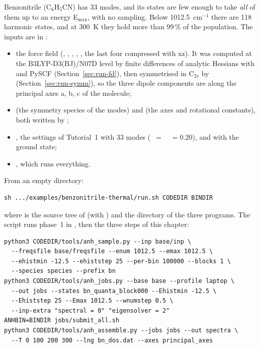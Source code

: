 Benzonitrile (C$_6$H$_5$CN) has 33 modes, and its states are few enough
to take \emph{all} of them up to an energy E$_\mathrm{max}$, with no
sampling. Below 1012.5~cm$^{-1}$ there are 118 harmonic states, and at
300~K they hold more than 99\,\% of the population. The inputs are in
:
\begin{itemize}
\item the force field (, ,
, , , the last four
compressed with xz). It was computed at the B3LYP-D3(BJ)/N07D level by
finite differences of analytic Hessians with  and PySCF
(Section~\ref{sec:run-fd}), then symmetrised in C$_{2v}$ by
(Section~\ref{sec:run-symm}), so the three dipole components are along
the principal axes a, b, c of the molecule;
\item {} (the symmetry species of the modes) and
 (the axes and rotational constants), both written
by ;
\item {}, the settings of Tutorial~1 with 33 modes
(~$=$~~$=0.20$), and 
with the ground state;
\item {}, which runs everything.
\end{itemize}
From an empty directory:
\begin{lstlisting}
sh .../examples/benzonitrile-thermal/run.sh CODEDIR BINDIR
\end{lstlisting}
where  is the source tree of \ac{} (with )
and  the directory of the three programs. The script runs
phase~1 in , then the three steps of this chapter:
\begin{lstlisting}
python3 CODEDIR/tools/anh_sample.py --inp base/inp \
  --freqsfile base/freqsfile --enum 1012.5 --emax 1012.5 \
  --ehistmin -12.5 --ehiststep 25 --per-bin 100000 --blocks 1 \
  --species species --prefix bn
python3 CODEDIR/tools/anh_jobs.py --base base --profile laptop \
  --out jobs --states bn_quanta_block000 --Ehistmin -12.5 \
  --Ehiststep 25 --Emax 1012.5 --wnumstep 0.5 \
  --inp-extra "spectral = 0" "eigensolver = 2"
ANHBIN=BINDIR jobs/submit_all.sh
python3 CODEDIR/tools/anh_assemble.py --jobs jobs --out spectra \
  --T 0 100 200 300 --lng bn_dos.dat --axes principal_axes
\end{lstlisting}
